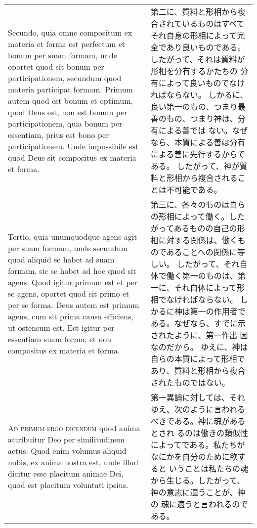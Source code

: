 \documentclass[10pt]{jsarticle} %
\begin{document}
\begin{longtable}{p{21em}p{21em}}
Secundo, quia omne compositum ex materia et forma est perfectum et
 bonum per suam formam, unde oportet quod sit bonum per participationem,
 secundum quod materia participat formam.
Primum autem quod est bonum et optimum, quod Deus est, non est bonum per participationem, quia bonum per essentiam, prius est bono per participationem.
Unde impossibile est quod Deus sit compositus ex materia et forma.

&

第二に、質料と形相から複合されているものはすべてそれ自身の形相によって完
 全であり良いものである。したがって、それは質料が形相を分有するかたちの
 分有によって良いものでなければならない。
しかるに、良い第一のもの、つまり最善のもの、つまり神は、分有による善では
ない。なぜなら、本質による善は分有による善に先行するからである。
したがって、神が質料と形相から複合されることは不可能である。
\\


Tertio, quia unumquodque agens agit per suam formam, unde secundum quod aliquid se habet ad suam formam, sic se habet ad hoc quod sit agens.
Quod igitur primum est et per se agens, oportet quod sit primo et per se
 forma.
Deus autem est primum agens, cum sit prima causa efficiens, ut
 ostensum est.
Est igitur per essentiam suam forma; et non compositus ex materia et
 forma.

&


第三に、各々のものは自らの形相によって働く。したがってあるものの自己の形相に対する関係は、働くものであることへの関係に等しい。
したがって、それ自体で働く第一のものは、第一に、それ自体によって形相でなければならない。
しかるに神は第一の作用者である。なぜなら、すでに示されたように、第一作出
 因なのだから。
ゆえに、神は自らの本質によって形相であり、質料と形相から複合されたものではない。

\\




\textsc{Ad primum ergo dicendum} quod anima attribuitur Deo per
 similitudinem actus. Quod enim volumus aliquid nobis, ex anima nostra
 est, unde illud dicitur esse placitum animae Dei, quod est placitum
 voluntati ipsius.

&

第一異論に対しては、それゆえ、次のように言われるべきである。神に魂があるとされ
 るのは働きの類似性によってである。私たちがなにかを自分のために欲すると
 いうことは私たちの魂から生じる。したがって、神の意志に適うことが、神の
 魂に適うと言われるのである。


\\


\end{longtable}
\end{document}
